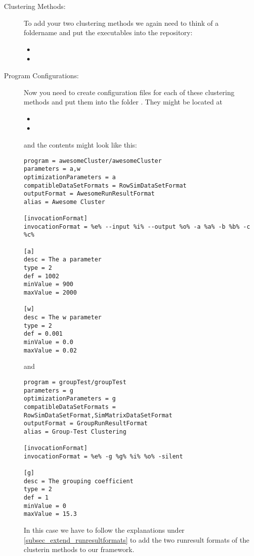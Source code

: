 \begin{description}
	\item[Clustering Methods:] To add your two clustering methods we again need to think of a foldername and put the executables into the repository:
	\begin{itemize}
		\item {}
		\item {}
	\end{itemize}
	
	\item[Program Configurations:] Now you need to create configuration files for each of these clustering methods and put them into the folder \highlight{\repoprogramconfigs}. They might be located at
	\begin{itemize}
		\item {}
		\item {}
	\end{itemize}
	and the contents might look like this:
	
	\begin{lstlisting}
program = awesomeCluster/awesomeCluster
parameters = a,w
optimizationParameters = a
compatibleDataSetFormats = RowSimDataSetFormat
outputFormat = AwesomeRunResultFormat
alias = Awesome Cluster

[invocationFormat]
invocationFormat = %e% --input %i% --output %o% -a %a% -b %b% -c %c%

[a]
desc = The a parameter
type = 2
def = 1002
minValue = 900
maxValue = 2000

[w]
desc = The w parameter
type = 2
def = 0.001
minValue = 0.0
maxValue = 0.02
	\end{lstlisting}
	and
	
	\begin{lstlisting}
program = groupTest/groupTest
parameters = g
optimizationParameters = g
compatibleDataSetFormats = RowSimDataSetFormat,SimMatrixDataSetFormat
outputFormat = GroupRunResultFormat
alias = Group-Test Clustering

[invocationFormat]
invocationFormat = %e% -g %g% %i% %o% -silent

[g]
desc = The grouping coefficient
type = 2
def = 1
minValue = 0
maxValue = 15.3
	\end{lstlisting}
	
	In this case we have to follow the explanations under \ref{subsec_extend_runresultformats} to add the two runresult formats of the clusterin methods to our framework.
	

\end{description}
